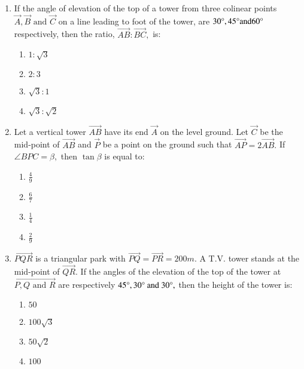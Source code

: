 \documentclass[journal]{IEEEtran}
\theoremstyle{remark}
\begin{document}
\begin{enumerate}
\item If the angle of elevation of the top of a tower from three colinear points $\vec{A},\vec{B}\text{ and }\vec{C}$ on a line leading to foot of the tower, are $30\degree,45\degree \text{and}  60\degree$ respectively, then the ratio, $\vec{AB}:\vec{BC},$ is: 
\hfill{}
\begin{multicols}{4}
\begin{enumerate}
        \item $1:\sqrt{3}$                    
        \item $2:3$ 
        \item $\sqrt{3}:1$ 
        \item $\sqrt{3}:\sqrt{2}$
\end{enumerate}
\end{multicols} 

\item Let a vertical tower $\vec{AB}$ have its end $\vec{A}$ on the level ground. Let $\vec{C}$ be the  mid-point of $\vec{AB}$ and $\vec{P}$ be a point on the ground such that $\vec{AP}=2\vec{AB}.$ If $\angle{BPC}=\beta,$ then $\tan \beta$ is equal to: \hfill{}
\begin{multicols}{4}
\begin{enumerate}
        \item $\frac{4}{9}$                    
        \item $\frac{6}{7}$ 
        \item $\frac{1}{4}$ 
        \item $\frac{2}{9}$
\end{enumerate}
\end{multicols} 

\item $\vec{PQR}$ is a triangular park with $\vec{PQ}=\vec{PR}=200m$. A T.V. tower stands at the mid-point of $\vec{QR}$. If the angles of the elevation of the top of the tower at $\vec{P,Q \text{ and } R}$ are respectively $45\degree , 30\degree \text{ and } 30\degree,$ then the height of the tower  is: \hfill{}
\begin{multicols}{4}
\begin{enumerate}
        \item $50$                    
        \item $100\sqrt{3}$ 
        \item $50\sqrt{2}$ 
        \item $100$
\end{enumerate}
\end{multicols} 


\end{enumerate}
\end{document}
